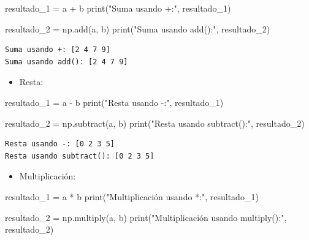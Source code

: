 \documentclass[
  letterpaper,
  DIV=11,
  numbers=noendperiod]{scrreprt}
\newenvironment{Shaded}{\begin{snugshade}}{\end{snugshade}}
\newcommand{\BuiltInTok}[1]{\textcolor[rgb]{0.00,0.23,0.31}{#1}}
\newcommand{\NormalTok}[1]{\textcolor[rgb]{0.00,0.23,0.31}{#1}}
\newcommand{\OperatorTok}[1]{\textcolor[rgb]{0.37,0.37,0.37}{#1}}
\newcommand{\StringTok}[1]{\textcolor[rgb]{0.13,0.47,0.30}{#1}}
\providecommand{\tightlist}{%
  \setlength{\itemsep}{0pt}\setlength{\parskip}{0pt}}\usepackage{longtable,booktabs,array}
\begin{document}
\begin{Shaded}
\begin{Highlighting}[]
\NormalTok{resultado\_1 }\OperatorTok{=}\NormalTok{ a }\OperatorTok{+}\NormalTok{ b}
\BuiltInTok{print}\NormalTok{(}\StringTok{"Suma usando +:"}\NormalTok{, resultado\_1) }

\NormalTok{resultado\_2 }\OperatorTok{=}\NormalTok{ np.add(a, b)}
\BuiltInTok{print}\NormalTok{(}\StringTok{"Suma usando add():"}\NormalTok{, resultado\_2) }
\end{Highlighting}
\end{Shaded}

\begin{verbatim}
Suma usando +: [2 4 7 9]
Suma usando add(): [2 4 7 9]
\end{verbatim}

\begin{itemize}
\tightlist
\item
  Resta:
\end{itemize}

\begin{Shaded}
\begin{Highlighting}[]
\NormalTok{resultado\_1 }\OperatorTok{=}\NormalTok{ a }\OperatorTok{{-}}\NormalTok{ b}
\BuiltInTok{print}\NormalTok{(}\StringTok{"Resta usando {-}:"}\NormalTok{, resultado\_1) }

\NormalTok{resultado\_2 }\OperatorTok{=}\NormalTok{ np.subtract(a, b)}
\BuiltInTok{print}\NormalTok{(}\StringTok{"Resta usando subtract():"}\NormalTok{, resultado\_2) }
\end{Highlighting}
\end{Shaded}

\begin{verbatim}
Resta usando -: [0 2 3 5]
Resta usando subtract(): [0 2 3 5]
\end{verbatim}

\begin{itemize}
\tightlist
\item
  Multiplicación:
\end{itemize}

\begin{Shaded}
\begin{Highlighting}[]
\NormalTok{resultado\_1 }\OperatorTok{=}\NormalTok{ a }\OperatorTok{*}\NormalTok{ b}
\BuiltInTok{print}\NormalTok{(}\StringTok{"Multiplicación usando *:"}\NormalTok{, resultado\_1) }

\NormalTok{resultado\_2 }\OperatorTok{=}\NormalTok{ np.multiply(a, b)}
\BuiltInTok{print}\NormalTok{(}\StringTok{"Multiplicación usando multiply():"}\NormalTok{, resultado\_2) }
\end{Highlighting}
\end{Shaded}
\end{document}
